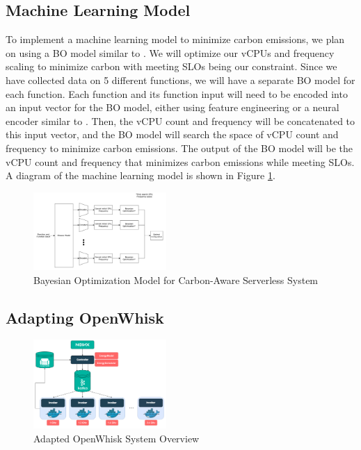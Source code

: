 \documentclass[times, 10pt,twocolumn]{article}
\begin{document}
\subsection{Machine Learning Model}
To implement a machine learning model to minimize carbon emissions, we plan on using a BO model similar to \cite{CherryPick}. We will optimize our vCPUs and frequency scaling to minimize carbon with meeting SLOs being our constraint. Since we have collected data on 5 different functions, we will have a separate BO model for each function. Each function and its function input will need to be encoded into an input vector for the BO model, either using feature engineering or a neural encoder similar to \cite{AQUATOPE}. Then, the vCPU count and frequency will be concatenated to this input vector, and the BO model will search the space of vCPU count and frequency to minimize carbon emissions. The output of the BO model will be the vCPU count and frequency that minimizes carbon emissions while meeting SLOs. A diagram of the machine learning model is shown in Figure \ref{fig:ml_model}.

\begin{figure}[ht]
   \centering
   \includegraphics[width=0.45\textwidth]{imgs/ml_model.png}
   \caption{Bayesian Optimization Model for Carbon-Aware Serverless System}
   \label{fig:ml_model}
 \end{figure}
\subsection{Adapting OpenWhisk}

\begin{figure}[ht]
   \centering
   \includegraphics[width=0.45\textwidth]{imgs/Adapted_OW_System_Overview.png}
   \caption{Adapted OpenWhisk System Overview}
   \label{fig:adapted_ow_system_overview}
 \end{figure}
\end{document}
